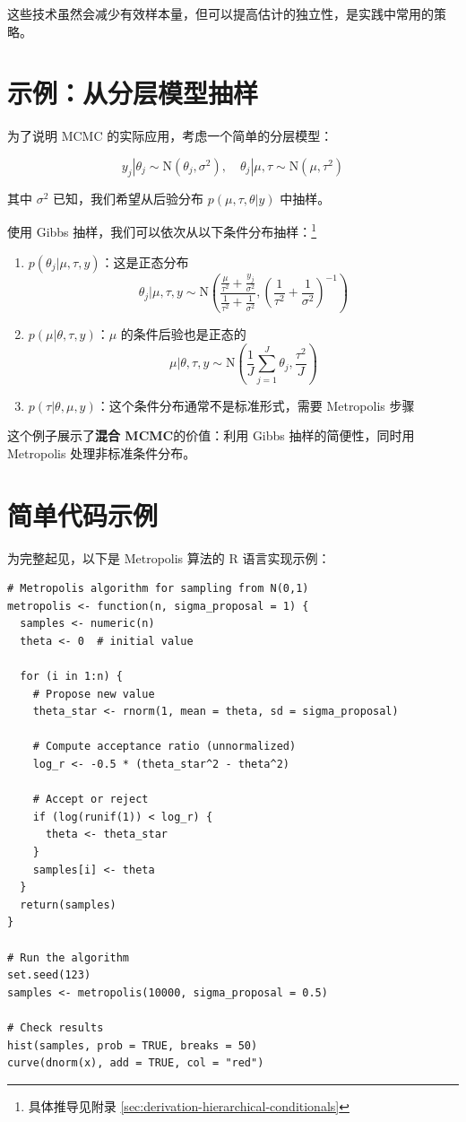这些技术虽然会减少有效样本量，但可以提高估计的独立性，是实践中常用的策略。

\section{示例：从分层模型抽样}

为了说明 MCMC 的实际应用，考虑一个简单的分层模型：

\begin{equation}\label{eq:hierarchical-model}
y_j | \theta_j \sim \mathrm{N}(\theta_j, \sigma^2), \quad \theta_j | \mu, \tau \sim \mathrm{N}(\mu, \tau^2)
\end{equation}

其中 $\sigma^2$ 已知，我们希望从后验分布 $p(\mu, \tau, \theta | y)$ 中抽样。

使用 Gibbs 抽样，我们可以依次从以下条件分布抽样：\footnote{具体推导见附录 \cref{sec:derivation-hierarchical-conditionals}}

\begin{enumerate}
  \item $p(\theta_j | \mu, \tau, y)$：这是正态分布
    \[
    \theta_j | \mu, \tau, y \sim \mathrm{N}\!\left(\frac{\frac{\mu}{\tau^2} + \frac{y_j}{\sigma^2}}{\frac{1}{\tau^2} + \frac{1}{\sigma^2}}, \left(\frac{1}{\tau^2} + \frac{1}{\sigma^2}\right)^{-1}\right)
    \]
  \item $p(\mu | \theta, \tau, y)$：$\mu$ 的条件后验也是正态的
    \[
    \mu | \theta, \tau, y \sim \mathrm{N}\!\left(\frac{1}{J}\sum_{j=1}^J \theta_j, \frac{\tau^2}{J}\right)
    \]
  \item $p(\tau | \theta, \mu, y)$：这个条件分布通常不是标准形式，需要 Metropolis 步骤
\end{enumerate}

这个例子展示了\textbf{混合 MCMC}的价值：利用 Gibbs 抽样的简便性，同时用 Metropolis 处理非标准条件分布。

\section{简单代码示例}

为完整起见，以下是 Metropolis 算法的 R 语言实现示例：

\begin{verbatim}
# Metropolis algorithm for sampling from N(0,1)
metropolis <- function(n, sigma_proposal = 1) {
  samples <- numeric(n)
  theta <- 0  # initial value

  for (i in 1:n) {
    # Propose new value
    theta_star <- rnorm(1, mean = theta, sd = sigma_proposal)

    # Compute acceptance ratio (unnormalized)
    log_r <- -0.5 * (theta_star^2 - theta^2)

    # Accept or reject
    if (log(runif(1)) < log_r) {
      theta <- theta_star
    }
    samples[i] <- theta
  }
  return(samples)
}

# Run the algorithm
set.seed(123)
samples <- metropolis(10000, sigma_proposal = 0.5)

# Check results
hist(samples, prob = TRUE, breaks = 50)
curve(dnorm(x), add = TRUE, col = "red")
\end{verbatim}

